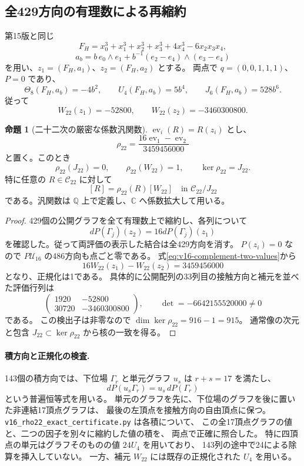 \documentclass[a4paper,11pt]{ltjsarticle}
\theoremstyle{definition}
\newtheorem{proposition}[theorem]{命題}
\begin{document}
\subsection{全429方向の有理数による再縮約}

第15版と同じ
\[
 F_H=x_0^3+x_1^3+x_2^3+x_3^3+4x_4^3-6x_2x_3x_4,
\]
\[
 a_b=b\,e_0\wedge e_1+b^{-1}(e_2-e_4)\wedge(e_3-e_4)
\]
を用い、$z_1=(F_H,a_1)$、$z_2=(F_H,a_2)$ とする。
両点で $q=(0,0,1,1,1)$、$P=0$ であり、
\[
 \Theta_8(F_H,a_b)=-4b^2,\qquad
 U_4(F_H,a_b)=5b^4,\qquad J_6(F_H,a_b)=528b^6.
\]
従って
\begin{equation}\label{eq:v16-complement-two-values}
 W_{22}(z_1)=-52800,\qquad
 W_{22}(z_2)=-3460300800.
\end{equation}

\begin{proposition}[二十二次の厳密な係数汎関数]
\label{prop:v16-exact-rho22}
$\operatorname{ev}_i(R)=R(z_i)$ とし、
\begin{equation}\label{eq:v16-exact-rho22}
 \boxed{\displaystyle
 \rho_{22}=
 \frac{16\operatorname{ev}_1-\operatorname{ev}_2}{3459456000}}
\end{equation}
と置く。このとき
\[
 \rho_{22}(J_{22})=0,\qquad
 \rho_{22}(W_{22})=1,\qquad
                       \ker\rho_{22}=J_{22}.
\]
特に任意の $R\in\mathcal C_{22}$ に対して
\[
 [R]=\rho_{22}(R)[W_{22}]
                        \quad\text{in }\mathcal C_{22}/J_{22}
\]
である。汎関数は $\mathbb Q$ 上で定義し、$\mathbb C$ へ係数拡大して用いる。
\end{proposition}

\begin{proof}
429個の公開グラフを全て有理数上で縮約し、各列について
\[
                      dP(\Gamma_j)(z_2)=16dP(\Gamma_j)(z_1)
\]
を確認した。従って両評価の表示した結合は全429方向を消す。
$P(z_i)=0$ なので $P\mathcal U_{16}$ の486方向も点ごと零である。
式\eqref{eq:v16-complement-two-values}から
\[
 16W_{22}(z_1)-W_{22}(z_2)=3459456000
\]
となり、正規化は1である。
具体的に公開配列の33列目の接触方向と補元を並べた評価行列は
\[
 \begin{pmatrix}
 1920&-52800\\
 30720&-3460300800
 \end{pmatrix},\qquad
 \det=-6642155520000\ne0
\]
である。
この検出子は非零なので $\dim\ker\rho_{22}=916-1=915$。
通常像の次元と包含 $J_{22}\subset\ker\rho_{22}$ から核の一致を得る。
\end{proof}

\paragraph{積方向と正規化の検査.}
143個の積方向では、下位場 $\Gamma_r$ と単元グラフ $u_s$ は $r+s=17$ を満たし、
\[
 dP(u_s\Gamma_r)=u_s\,dP(\Gamma_r)
\]
という普遍恒等式を用いる。
単元のグラフを先に、下位場のグラフを後に置いた非連結17頂点グラフは、
最後の左頂点を接触方向の自由頂点に保つ。
\nolinkurl{v16_rho22_exact_certificate.py} は各積について、
この全17頂点グラフの値と、二つの因子を別々に縮約した値の積を、
両点で正確に照合した。
特に四頂点の単元はグラフそのものの値 $24U_4$ を用いており、
143列の途中で24による除算を挿入していない。
一方、補元 $W_{22}$ には既存の正規化された $U_4$ を用いる。
\end{document}
